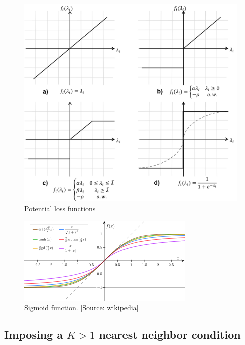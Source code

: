 \documentclass[]{article}
\begin{document}
\begin{figure}[htbp]
\begin{center}
\includegraphics[scale=0.7]{Loss_functions_concatenated.png}
\caption{Potential loss functions}
\label{fig:loss_functions_concatenated}
\end{center}
\end{figure}


\begin{figure}[htbp]
\begin{center}
\includegraphics[scale=0.7]{sigmoid_from_wikipedia.png}
\caption{Sigmoid function. [Source: wikipedia]}
\label{fig:sigmoid}
\end{center}
\end{figure}


\subsection{Imposing a $K>1$ nearest neighbor condition}
\end{document}
